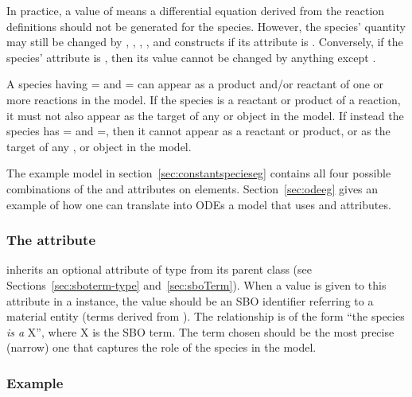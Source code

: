 In practice, a  value of  means
a differential equation derived from the reaction definitions
should not be generated for the species.  However, the species'
quantity may still be changed by \AssignmentRule, \RateRule,
\AlgebraicRule, \Event, and \InitialAssignment constructs if its
 attribute is .  Conversely, if the
species'  attribute is , then its value
cannot be changed by anything except \InitialAssignment.

A species having = and
= can appear as a product and/or
reactant of one or more reactions in the model.  If the species is
a reactant or product of a reaction, it must not also appear as
the target of any \AssignmentRule or \RateRule object in the
model.  If instead the species \color{black} has
= and
=, then it cannot appear as a reactant
or product, or as the target of any \AssignmentRule, \RateRule or
\EventAssignment object in the model.

The example model in section~\ref{sec:constantspecieseg} contains
all four possible combinations of the 
and  attributes on  elements.
Section~\ref{sec:odeeg} gives an example of how one can translate
into ODEs a model that uses  and
 attributes.


\subsubsection{The  attribute}
\label{sec:species-sboterm}

\Species inherits an optional  attribute
of type  from its parent class \SBase (see
Sections~\ref{sec:sboterm-type} and~\ref{sec:sboTerm}).  When a
value is given to this attribute in a \Species instance,
the value should be an SBO identifier referring to a material entity (\ie terms derived from \sbomaterialentity).
The relationship is of the form ``the species \emph{is a} X'',
where X is the SBO term.  The term chosen should be the most
precise (narrow) one that captures the role of the species
in the model.


\subsubsection{Example}

